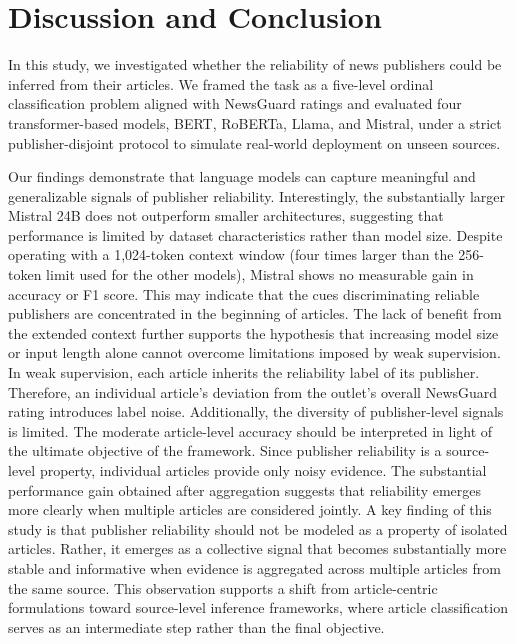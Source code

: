 \documentclass[journal]{IEEEtran}
\begin{document}
    

\section{Discussion and Conclusion}
\label{sec:conclusions}
In this study, we investigated whether the reliability of news publishers could be inferred from their articles. We framed the task as a five-level ordinal classification problem aligned with NewsGuard ratings and evaluated four transformer-based models, BERT, RoBERTa, Llama, and Mistral, under a strict publisher-disjoint protocol to simulate real-world deployment on unseen sources.

Our findings demonstrate that language models can capture meaningful and generalizable signals of publisher reliability. Interestingly, the substantially larger Mistral 24B does not outperform smaller architectures, suggesting that performance is limited by dataset characteristics rather than model size. Despite operating with a 1,024-token context window (four times larger than the 256-token limit used for the other models), Mistral shows no measurable gain in accuracy or F1 score. This may indicate that the cues discriminating reliable publishers are concentrated in the beginning of articles. The lack of benefit from the extended context further supports the hypothesis that increasing model size or input length alone cannot overcome limitations imposed by weak supervision. In weak supervision, each article inherits the reliability label of its publisher. Therefore, an individual article's deviation from the outlet's overall NewsGuard rating introduces label noise. Additionally, the diversity of publisher-level signals is limited. The moderate article-level accuracy should be interpreted in light of the ultimate objective of the framework. Since publisher reliability is a source-level property, individual articles provide only noisy evidence. The substantial performance gain obtained after aggregation suggests that reliability emerges more clearly when multiple articles are considered jointly. A key finding of this study is that publisher reliability should not be modeled as a property of isolated articles. Rather, it emerges as a collective signal that becomes substantially more stable and informative when evidence is aggregated across multiple articles from the same source. This observation supports a shift from article-centric formulations toward source-level inference frameworks, where article classification serves as an intermediate step rather than the final objective.
\end{document}
